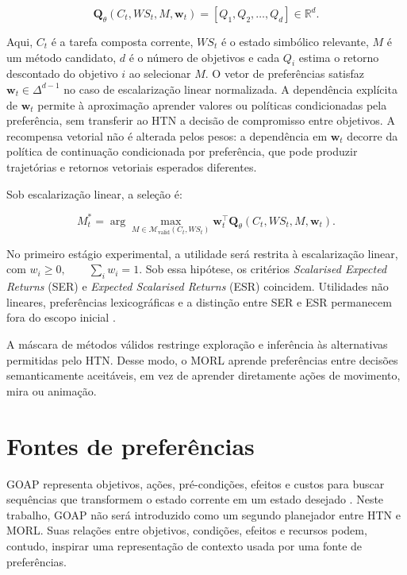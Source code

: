 \begin{equation}
\mathbf{Q}_{\theta}(C_t,WS_t,M,\mathbf{w}_t)
=
\left[Q_1,Q_2,\dots,Q_d\right]\in\mathbb{R}^d.
\end{equation}

Aqui, $C_t$ é a tarefa composta corrente, $WS_t$ é o estado simbólico relevante,
$M$ é um método candidato, $d$ é o número de objetivos e cada $Q_i$ estima o
retorno descontado do objetivo $i$ ao selecionar $M$. O vetor de preferências
satisfaz $\mathbf{w}_t\in\Delta^{d-1}$ no caso de escalarização linear
normalizada.
A dependência explícita de $\mathbf{w}_t$ permite à aproximação aprender valores
ou políticas condicionadas pela preferência, sem transferir ao HTN a decisão de
compromisso entre objetivos.
A recompensa vetorial não é alterada pelos pesos: a dependência em
$\mathbf{w}_t$ decorre da política de continuação condicionada por preferência,
que pode produzir trajetórias e retornos vetoriais esperados diferentes.

Sob escalarização linear, a seleção é:

\begin{equation}
 M_t^* =
 \arg\max_{M\in \mathcal{M}_{\mathrm{valid}}(C_t,WS_t)}
 \mathbf{w}_t^{\top}
 \mathbf{Q}_{\theta}(C_t,WS_t,M,\mathbf{w}_t).
\end{equation}

No primeiro estágio experimental, a utilidade será restrita à escalarização
linear, com $w_i\geq 0,\qquad \sum_i w_i=1$.
Sob essa hipótese, os critérios \textit{Scalarised Expected Returns} (SER) e
\textit{Expected Scalarised Returns} (ESR) coincidem.
Utilidades não lineares, preferências lexicográficas e a distinção entre SER
e ESR permanecem fora do escopo inicial \cite{hayes2022morl}.

A máscara de métodos válidos restringe exploração e inferência às alternativas
permitidas pelo HTN. Desse modo, o MORL aprende preferências entre decisões
semanticamente aceitáveis, em vez de aprender diretamente ações de movimento,
mira ou animação.

\section{Fontes de preferências}

GOAP representa objetivos, ações, pré-condições, efeitos e custos para buscar
sequências que transformem o estado corrente em um estado desejado
\cite{orkin2005,orkin2006}.
Neste trabalho, GOAP não será introduzido como um segundo planejador entre
HTN e MORL. Suas relações entre objetivos, condições, efeitos e recursos
podem, contudo, inspirar uma representação de contexto usada por uma fonte de
preferências.

